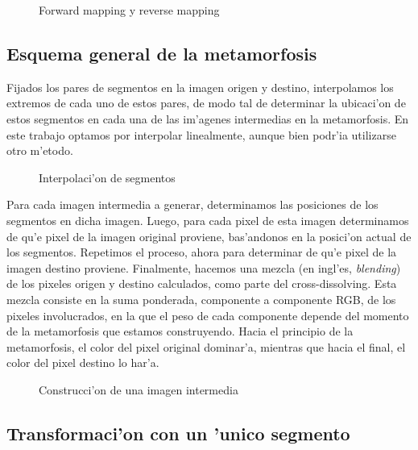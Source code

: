 \begin{figure}[H]
	\begin{center}
		
	\end{center}		
	\caption{Forward mapping y reverse mapping}
	\label{fig4}
\end{figure}

\subsection{Esquema general de la metamorfosis}

Fijados los pares de segmentos en la imagen origen y destino, interpolamos los extremos de cada uno de estos pares, de modo tal de determinar la ubicaci'on de estos segmentos en cada una de las im'agenes intermedias en la metamorfosis. En este trabajo optamos por interpolar linealmente, aunque bien podr'ia utilizarse otro m'etodo.

\begin{figure}[H]
	\begin{center}
		
	\end{center}		
	\caption{Interpolaci'on de segmentos}
	\label{fig5}
\end{figure}

Para cada imagen intermedia a generar, determinamos las posiciones de los segmentos en dicha imagen. Luego, para cada pixel de esta imagen determinamos de qu'e pixel de la imagen original proviene, bas'andonos en la posici'on actual de los segmentos. Repetimos el proceso, ahora para determinar de qu'e pixel de la imagen destino proviene. Finalmente, hacemos una mezcla (en ingl'es, \textit{blending}) de los pixeles origen y destino calculados, como parte del cross-dissolving. Esta mezcla consiste en la suma ponderada, componente a componente RGB, de los pixeles involucrados, en la que el peso de cada componente depende del momento de la metamorfosis que estamos construyendo. Hacia el principio de la metamorfosis, el color del pixel original dominar'a, mientras que hacia el final, el color del pixel destino lo har'a.

\begin{figure}[H]
	\begin{center}
		
	\end{center}		
	\caption{Construcci'on de una imagen intermedia}
	\label{fig6}
\end{figure}

\subsection{Transformaci'on con un 'unico segmento}

